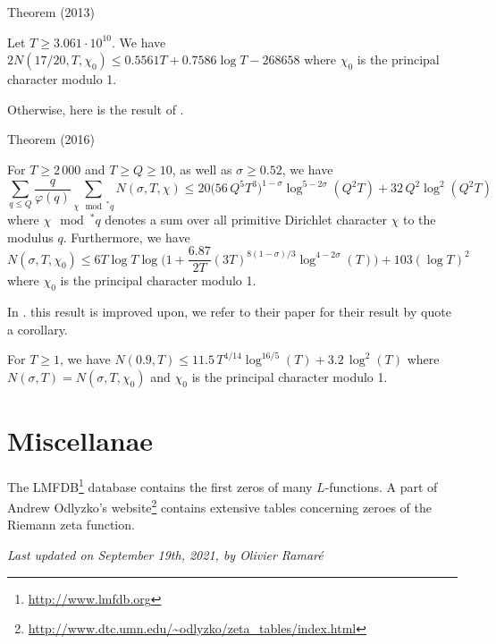 \par 
\begin{thm}{Theorem (2013)}

  Let $T\ge3.061\cdot10^{10}$. We have
  $
    2N(17/20,T,\chi_0)\le 0.5561T+0.7586\log T-268 658
  $
  where $\chi_0$ is the principal character modulo 1.
\end{thm}


Otherwise, here is the result of
\cite{Ramare*13d}.
\par 

\begin{thm}{Theorem (2016)}

  For $T\ge2\,000$ and $T\ge Q\ge10$, as well as $\sigma\ge0.52$, we have 
  $$
    \sum_{q\le Q}\frac{q}{\varphi(q)}
    \sum_{\chi\mod^* q}N(\sigma,T,\chi)
    \le 
    20\bigl(56\,Q^{5}T^3\bigr)^{1-\sigma}\log^{5-2\sigma}(Q^2T)
    +32\,Q^2\log^2(Q^2T)
  $$
  where $\chi\mod^* q$ denotes a sum over all primitive Dirichlet character
  $\chi$ to the modulus $q$. Furthermore, we have
  $$
    N(\sigma,T,\chi_0)\le 6T\log T
    \log\biggl(1+\frac{6.87}{2T}(3T)^{8(1-\sigma)/{3}}\log^{4-2\sigma}(T)\biggr)
    +103(\log T)^2
  $$
  where $\chi_0$ is the principal character modulo 1.
\end{thm}

In
\cite{Kadiri-Lumley-Ng*18}.
this result is improved upon, we refer to their paper for their result
by quote a corollary.


  For $T\ge1$, we have 
  $
    N(0.9,T)
    \le 
    11.5\, T^{4/14}\log^{16/5}(T)
    +3.2\,\log^2(T)
  $
  where $N(\sigma,T)=N(\sigma,T,\chi_0)$ and $\chi_0$ is the principal character modulo 1.


\section{Miscellanae}



The LMFDB\footnote{\url{http://www.lmfdb.org}} database contains the first zeros
of many $L$-functions. A part of Andrew Odlyzko's 
website\footnote{\url{http://www.dtc.umn.edu/~odlyzko/zeta_tables/index.html}}
contains extensive tables concerning zeroes of the Riemann zeta function.




 
 







  
\begin{flushright}\small\sl{}   Last updated on September 19th, 2021, by Olivier Ramar\'e
 \end{flushright}














